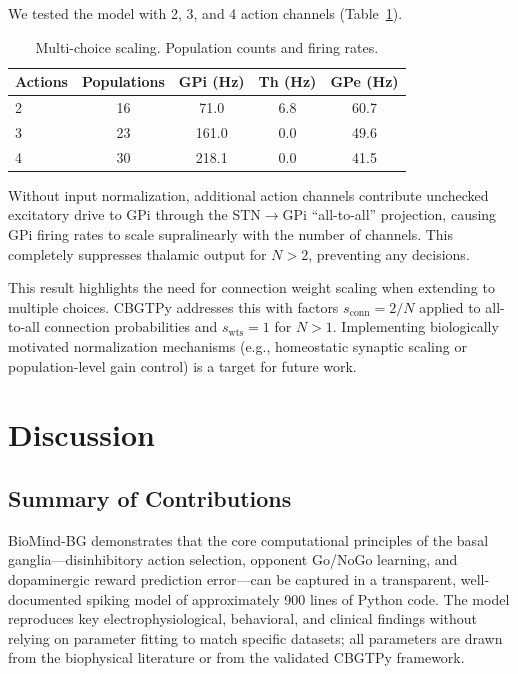 \documentclass[11pt,a4paper]{article}
\begin{document}
We tested the model with 2, 3, and 4 action channels (Table~\ref{tab:scaling}).

\begin{table}[h]
\centering
\caption{Multi-choice scaling. Population counts and firing rates.}
\label{tab:scaling}
\begin{tabular}{lcccc}
\toprule
Actions & Populations & GPi (Hz) & Th (Hz) & GPe (Hz) \\
\midrule
2 & 16 & 71.0 & 6.8 & 60.7 \\
3 & 23 & 161.0 & 0.0 & 49.6 \\
4 & 30 & 218.1 & 0.0 & 41.5 \\
\bottomrule
\end{tabular}
\end{table}

Without input normalization, additional action channels contribute unchecked excitatory drive to GPi through the STN$\rightarrow$GPi ``all-to-all'' projection, causing GPi firing rates to scale supralinearly with the number of channels. This completely suppresses thalamic output for $N > 2$, preventing any decisions.

This result highlights the need for connection weight scaling when extending to multiple choices. CBGTPy addresses this with factors $s_{\text{conn}} = 2/N$ applied to all-to-all connection probabilities and $s_{\text{wts}} = 1$ for $N > 1$. Implementing biologically motivated normalization mechanisms (e.g., homeostatic synaptic scaling or population-level gain control) is a target for future work.

\section{Discussion}

\subsection{Summary of Contributions}

BioMind-BG demonstrates that the core computational principles of the basal ganglia---disinhibitory action selection, opponent Go/NoGo learning, and dopaminergic reward prediction error---can be captured in a transparent, well-documented spiking model of approximately 900 lines of Python code. The model reproduces key electrophysiological, behavioral, and clinical findings without relying on parameter fitting to match specific datasets; all parameters are drawn from the biophysical literature or from the validated CBGTPy framework.
\end{document}
